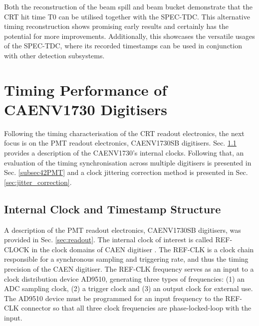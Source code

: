 Both the reconstruction of the beam spill and beam bucket demonstrate that the CRT hit time T0 can be utilised together with the SPEC-TDC.
This alternative timing reconstruction shows promising early results and certainly has the potential for more improvements.
Additionally, this showcases the versatile usages of the SPEC-TDC, where its recorded timestamps can be used in conjunction with other detection subsystems. 

\section{Timing Performance of CAENV1730 Digitisers}
\label{sec4PMT}

Following the timing characterisation of the CRT readout electronics, the next focus is on the PMT readout electronics, CAENV1730SB digitisers. 
Sec. \ref{subsec41PMT} provides a description of the CAENV1730's internal clocks.
Following that, an evaluation of the timing synchronisation across multiple digitisers is presented in Sec. \ref{subsec42PMT} and a clock jittering correction method is presented in Sec. \ref{sec:jitter_correction}.

\subsection{Internal Clock and Timestamp Structure}
\label{subsec41PMT}



A description of the PMT readout electronics, CAENV1730SB digitisers, was provided in Sec. \ref{sec:readout}.
The internal clock of interest is called REF-CLOCK in the clock domains of CAEN digitiser \cite{caen1730}.
The REF-CLK is a clock chain responsible for a synchronous sampling and triggering rate, and thus the timing precision of the CAEN digitiser.
The REF-CLK frequency serves as an input to a clock distribution device AD9510, generating three types of frequencies: (1) an ADC sampling clock, (2) a trigger clock and (3) an output clock for external use.
The AD9510 device must be programmed for an input frequency to the REF-CLK connector so that all three clock frequencies are phase-locked-loop with the input.


